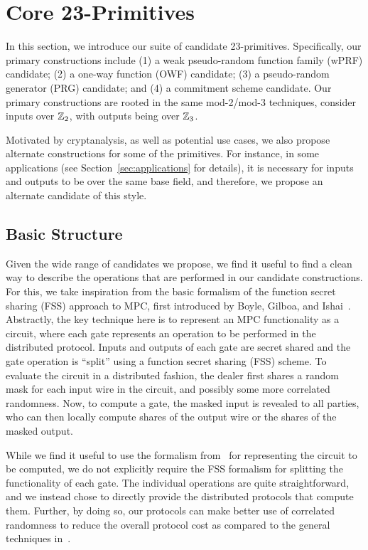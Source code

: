 
\newpage

\section{Core 23-Primitives}

In this section, we introduce our suite of candidate 23-primitives. Specifically, our primary constructions include (1) a weak pseudo-random function family (wPRF) candidate; (2) a one-way function (OWF) candidate; (3) a pseudo-random generator (PRG) candidate; and (4) a commitment scheme candidate. Our primary constructions are rooted in the same mod-2/mod-3 techniques, consider inputs over $\mathbb{Z}_2$, with outputs being over $\mathbb{Z}_3$.

Motivated by cryptanalysis, as well as potential use cases, we also propose alternate constructions for some of the primitives. For instance, in some applications (see Section~\ref{sec:applications} for details), it is necessary for inputs and outputs to be over the same base field, and therefore, we propose an alternate candidate of this style.


\subsection{Basic Structure}
Given the wide range of candidates we propose, we find it useful to find a clean way to describe the operations that are performed in our candidate constructions. For this, we take inspiration from the basic formalism of the function secret sharing (FSS) approach to MPC, first introduced by Boyle, Gilboa, and Ishai~\cite{boyle2019-fss-preprocess}. Abstractly, the key technique here is to represent an MPC functionality as a circuit, where each gate represents an operation to be performed in the distributed protocol. Inputs and outputs of each gate are secret shared and the gate operation is ``split'' using a function secret sharing (FSS) scheme. To evaluate the circuit in a distributed fashion, the dealer first shares a random mask for each input wire in the circuit, and possibly some more correlated randomness. Now, to compute a gate, the masked input is revealed to all parties, who can then locally compute shares of the output wire or the shares of the masked output.

While we find it useful to use the formalism from~\cite{boyle2019-fss-preprocess} for representing the circuit to be computed, we do not explicitly require the FSS formalism for splitting the functionality of each gate. The individual operations are quite straightforward, and we instead chose to directly provide the distributed protocols that compute them. Further, by doing so, our protocols can make better use of correlated randomness to reduce the overall protocol cost as compared to the general techniques in~\cite{boyle2019-fss-preprocess}.


